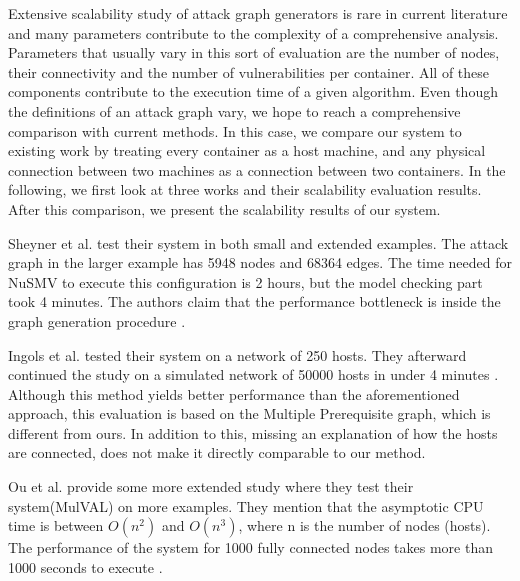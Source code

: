 Extensive scalability study of attack graph generators is rare in current literature and many parameters contribute to the complexity of a comprehensive analysis. Parameters that usually vary in this sort of evaluation are the number of nodes, their connectivity and the number of vulnerabilities per container. All of these components contribute to the execution time of a given algorithm. Even though the definitions of an attack graph vary, we hope to reach a comprehensive comparison with current methods. In this case, we compare our system to existing work by treating every container as a host machine, and any physical connection between two machines as a connection between two containers. In the following, we first look at three works and their scalability evaluation results. After this comparison, we present the scalability results of our system.

Sheyner et al. test their system in both small and extended examples. The attack graph in the larger example has 5948 nodes and 68364 edges. The time needed for NuSMV to execute this configuration is 2 hours, but the model checking part took 4 minutes. The authors claim that the performance bottleneck is inside the graph generation procedure \cite{sheyner2002automated}. 

Ingols et al. tested their system on a network of 250 hosts. They afterward continued the study on a simulated network of 50000 hosts in under 4 minutes \cite{ingols2006practical}. Although this method yields better performance than the aforementioned approach, this evaluation is based on the Multiple Prerequisite graph, which is different from ours. In addition to this, missing an explanation of how the hosts are connected, does not make it directly comparable to our method.

Ou et al. provide some more extended study where they test their system(MulVAL) on more examples. They mention that the asymptotic CPU time is between $O(n^2)$ and $O(n^3)$, where n is the number of nodes (hosts). The performance of the system for 1000 fully connected nodes takes more than 1000 seconds to execute \cite{ou2006scalable}. %

